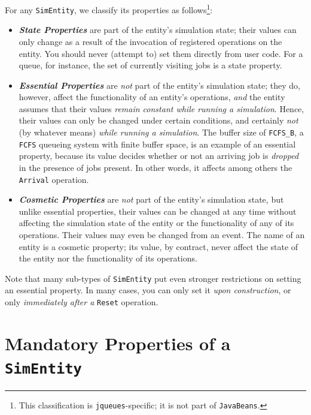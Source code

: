 For any \lstinline|SimEntity|,
  we classify its properties as follows\footnote{
  This classification is \texttt{jqueues}-specific;
  it is not part of \texttt{JavaBeans}.}:
\begin{itemize}
\item {\em\bf State Properties\/}
        are part of the entity's simulation state;
        their values can only change as a result of the invocation
        of registered operations on the entity.
      You should never (attempt to) set them directly from user code.
      For a queue, for instance,
        the set of currently visiting jobs
        is a state property.
\item {\em\bf Essential Properties} are {\em not\/} part
        of the entity's simulation state;
        they do, however, affect the
        functionality of an entity's operations,
        {\em and\/} the entity assumes that
        their values {\em remain constant while running a simulation}.
      Hence, 
        their values can only be changed under certain conditions,
        and certainly {\em not\/} (by whatever means)
        {\em while running a simulation}.
      The buffer size of \lstinline|FCFS_B|,
        a \lstinline|FCFS| queueing system with finite buffer space,
        is an example of an essential property,
      because its value decides whether or not an arriving job
        is {\em dropped\/} in the presence of jobs present.
      In other words,
        it affects among others the \lstinline|Arrival| operation.
\item {\em\bf Cosmetic Properties\/} are {\em not\/} part
        of the entity's simulation state,
        but unlike essential properties,
        their values can be changed
        at any time without affecting the simulation state of the entity
        or the functionality of any of its operations.
      Their values may even be changed from an event.
      The name of an entity is a cosmetic property;
        its value, by contract,
        never affect the state of the entity
        nor the functionality of its operations.
\end{itemize}
Note that many sub-types of \lstinline|SimEntity|
  put even stronger restrictions on
  setting an essential property.
In many cases,
  you can only set it {\em upon construction\/},
  or only {\em immediately after a\/} \lstinline|Reset| operation.
  
\section{Mandatory Properties of a \texttt{\bf SimEntity}}

